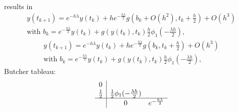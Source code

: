 \documentclass[letterpaper,10pt,english]{jupyterBook}
\begin{document}
\sphinxAtStartPar
results in
\begin{equation*}
\begin{split}
y(t_{k+1}) = e^{-h\lambda}y(t_k) + h e^{- \frac{h\lambda}{2}} g\left(b_k + O(h^2), t_k + \frac{h}{2}\right) + O(h^3) \\
    \text{with } b_k =e^{-\frac{h \lambda}{2}}y(t_k) + g(y(t_k), t_k) \frac{h}{2} \phi_1\left( -\frac{\lambda h}{2} \right),
\end{split}
\end{equation*}\begin{equation*}
\begin{split}
y(t_{k+1}) = e^{-h\lambda}y(t_k) + h e^{- \frac{h\lambda}{2}} g\left(b_k , t_k + \frac{h}{2}\right) + O(h^3) \\
    \text{with } b_k =e^{-\frac{h \lambda}{2}}y(t_k) + g(y(t_k), t_k) \frac{h}{2} \phi_1\left( -\frac{\lambda h}{2} \right),
\end{split}
\end{equation*}
\sphinxAtStartPar
Butcher tableau:
\begin{equation*}
\begin{split}
\begin{array}
{c|cc}
0\\
\frac{1}{2} &  \frac{1}{2} \phi_1( -\frac{\lambda h}{2})\\
\hline
& 0 & e^{-\frac{h \lambda}{2}}
\end{array}
\end{split}
\end{equation*}
\end{document}
